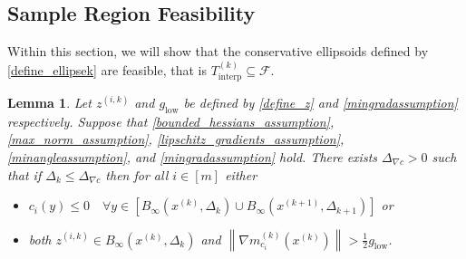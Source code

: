 \documentclass{article}
\newtheorem{lemma}[theorem]{Lemma}
\theoremstyle{case}
\numberwithin{theorem}{subsection}
\newcommand{\dk}{\Delta_k}
\newcommand{\dkpo}{\Delta_{k+1}}
\newcommand{\feasible}{{\mathcal F}}
\newcommand{\gmcik}{{\nabla m_{c_i}^{(k)}\left(\xk\right)}}
\newcommand{\mingraddelta}{{\Delta_{\nabla c}}}
\newcommand{\mingrad}{{ g_{\textrm{low}} }}
\newcommand{\sampletrk}{{T_{\text{interp}}^{(k)}}}
\newcommand{\tr}{{ B_{\infty}\left(\xk, \dk\right) }}
\newcommand{\trkpo}{{ B_{\infty}\left(\xkpo, \dkpo\right) }}
\newcommand{\xkpo}{{{x}^{(k+1)}}}
\newcommand{\xk}{x^{(k)}}
\newcommand{\zik}{{z^{(i, k)}}}
\newcommand{\fik}{{C^{(i, k)}}}
\begin{document}
\subsection{Sample Region Feasibility}
\label{ellipsoid_is_feasible_section}

Within this section, we will show that the conservative ellipsoids defined by \cref{define_ellipsek} are feasible, that is $\sampletrk \subseteq \feasible$.

\begin{lemma}
\label{only_small_z_matters}
Let $\zik$ and $\mingrad$ be defined by \cref{define_z} and \cref{mingradassumption} respectively.
Suppose that 
\cref{bounded_hessians_assumption},
\cref{max_norm_assumption},
\cref{lipschitz_gradients_assumption},
\cref{minangleassumption},
and \cref{mingradassumption} hold.
There exists $\mingraddelta > 0$ such that if $\dk \le \mingraddelta$ then for all $i \in [m]$ either
\begin{itemize}
\item $c_i(y) \le 0 \quad \forall y \in \left[\tr \cup \trkpo\right]$ or
\item both $\zik \in \tr$ and $\left\|\gmcik\right\| > \frac 1 2 \mingrad$.
\end{itemize}
\end{lemma}
\end{document}
